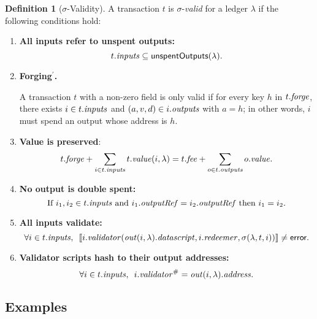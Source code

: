 \documentclass[a4paper]{article}
\theoremstyle{definition}  %
\newtheorem{definition}{Definition}
\begin{document}
\begin{definition}[$\sigma$-Validity]\label{def:validity-2} A transaction $t$ is $\sigma$-\emph{valid} for a ledger $\lambda$ if the following conditions hold:
  \begin{enumerate}
    \item \label{all-inputs-refer-to-unspent-outputs-2} \textbf{All
      inputs refer to unspent outputs:}
      \[
        t.\mathit{inputs} \subseteq \mathsf{unspentOutputs}(\lambda).
      \]
    \item\label{forging-2} \textbf{Forging$^{\prime}$.}
      \begin{center}
        \parbox{0.8\textwidth}{
          A transaction $t$ with a non-zero \forge{} field is only valid if for
          every key $h$ in $t.\mathit{forge}$, there exists $i \in t.\mathit{inputs}$
          and $(a,v,d) \in i.\mathit{outputs}$ with $a =h$; in other words, $i$
          must spend an output whose address is $h$.
          }
      
      \end{center}
    \item \label{value-is-preserved-2} \textbf{Value is preserved}:
    \[
      t.\mathit{forge} + \sum_{i \in t.\mathit{inputs}} t.\mathit{value}(i, \lambda) = t.\mathit{fee} + \sum_{o \in t.\mathit{outputs}} o.\mathit{value}.
    \]
    \item \label{no-double-spending-2} \textbf{No output is double spent:}
    \[
     \textrm{If } i_1, i_2 \in t.\mathit{inputs} \textrm{ and }  i_1.\mathit{outputRef} = i_2.\mathit{outputRef}
     \textrm{ then } i_1 = i_2.
    \]
    \item\label{all-inputs-validate-2} \textbf{All inputs validate:}
    \[
    \forall i \in t.\mathit{inputs},\enspace \llbracket
    i.\mathit{validator}(\mathit{out}(i,
    \lambda).\mathit{datascript},i.\mathit{redeemer}, \sigma(\lambda, t, i))
    \rrbracket \ne \textsf{error}.
      \]
    \item\label{validator-scripts-hash-2} \textbf{Validator scripts hash to their output addresses:}
    \[
      \forall i \in t.\mathit{inputs},\enspace i.\mathit{validator}^{\#} = \mathit{out}(i, \lambda).\mathit{address}.
    \]
  \end{enumerate}
\end{definition}


\subsection{Examples}
\end{document}
